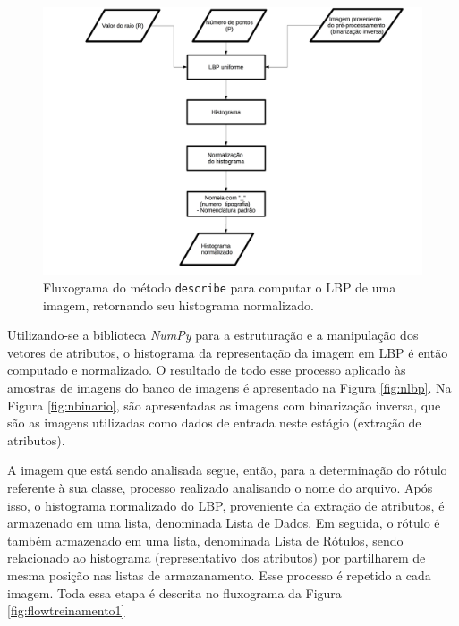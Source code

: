 \begin{figure}[H]
  \centering
  \includegraphics[width=1\linewidth]{figuras/lbp.pdf}
  \caption{Fluxograma do método \texttt{describe} para computar o LBP de uma imagem, retornando seu histograma normalizado.}
  \label{fig:flowLBP}
\end{figure}

Utilizando-se a biblioteca \textit{NumPy} para a estruturação e a manipulação dos vetores de atributos, o histograma da representação da imagem em LBP é então computado e normalizado. O resultado de todo esse processo aplicado às amostras de imagens do banco de imagens é apresentado na Figura \ref{fig:nlbp}. Na Figura \ref{fig:nbinario}, são apresentadas as imagens com binarização inversa, que são as imagens utilizadas como dados de entrada neste estágio (extração de atributos).



A imagem que está sendo analisada segue, então, para a determinação do rótulo referente à sua classe, processo realizado analisando o nome do arquivo. Após isso, o histograma normalizado do LBP, proveniente da extração de atributos, é armazenado em uma lista, denominada Lista de Dados. Em seguida, o rótulo é também armazenado em uma lista, denominada Lista de Rótulos, sendo relacionado ao histograma (representativo dos atributos) por partilharem de mesma posição nas listas de armazanamento. Esse processo é repetido a cada imagem. Toda essa etapa é descrita no fluxograma da Figura \ref{fig:flowtreinamento1}

